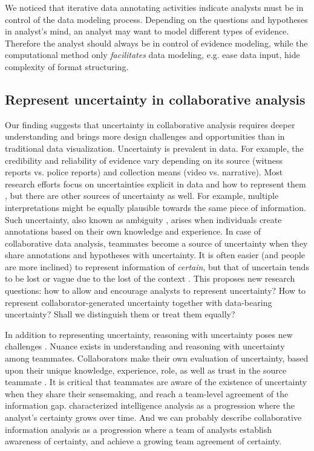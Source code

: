 We noticed that iterative data annotating activities indicate analysts must be in control of the data modeling process.
Depending on the questions and hypotheses in analyst's mind, an analyst may want to model different types of evidence. Therefore the analyst should always be in control of evidence modeling, while the computational method only \emph{facilitates} data modeling, e.g. ease data input, hide complexity of format structuring. 



\subsection{Represent uncertainty in collaborative analysis }

Our finding suggests that uncertainty in collaborative analysis requires deeper understanding and brings more design challenges and opportunities than in traditional data visualization. Uncertainty is prevalent in data. For example, the credibility and reliability of evidence vary depending on its source (witness reports vs. police reports) and collection means (video vs. narrative). Most research efforts focus on uncertainties explicit in data and how to represent them \citep{Pang1997,Zuk2008}, but there are other sources of uncertainty as well. For example, multiple interpretations might be equally plausible towards the same piece of information. Such uncertainty, also known as ambiguity \citep{Nowak2020}, arises when individuals create annotations based on their own knowledge and experience. In case of collaborative data analysis, teammates become a source of uncertainty when they share annotations and hypotheses with uncertainty. 
It is often easier (and people are more inclined) to represent information of \textit{certain}, but that of uncertain tends to be lost or vague due to the lost of the context \citep{prue2014overcoming}. This proposes new research questions: how to allow and encourage analysts to represent uncertainty? How to represent collaborator-generated uncertainty together with data-bearing uncertainty? Shall we distinguish them or treat them equally? 

In addition to representing uncertainty, reasoning with uncertainty poses new challenges \citep{MacEachren2015}. Nuance exists in understanding and reasoning with uncertainty among teammates. Collaborators make their own evaluation of uncertainty, based upon their unique knowledge, experience, role, as well as trust in the source teammate \citep{Chin2009}. It is critical that teammates are aware of the existence of uncertainty when they share their sensemaking, and reach a team-level agreement of the information gap. \cite{Graves2000} characterized intelligence analysis as a progression where the analyst's certainty grows over time. And we can probably describe collaborative information analysis as a progression where a team of analysts establish awareness of certainty, and achieve a growing team agreement of certainty. 

